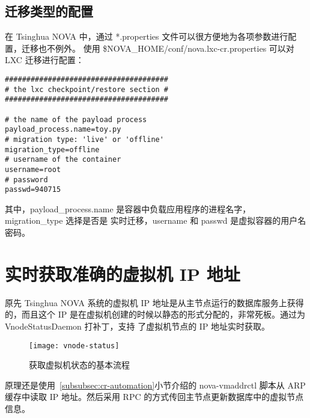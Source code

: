 \subsection{迁移类型的配置}

在 Tsinghua NOVA 中，通过 *.properties 文件可以很方便地为各项参数进行配置，迁移也不例外。
使用 \$NOVA\_HOME/conf/nova.lxc-cr.properties 可以对 LXC 迁移进行配置：

\begin{lstlisting}
######################################
# the lxc checkpoint/restore section #
######################################

# the name of the payload process
payload_process.name=toy.py
# migration type: 'live' or 'offline'
migration_type=offline
# username of the container
username=root
# password
passwd=940715
\end{lstlisting}

其中，payload\_process.name 是容器中负载应用程序的进程名字，migration\_type 选择是否是
实时迁移，username 和 passwd 是虚拟容器的用户名密码。

\section{实时获取准确的虚拟机 IP 地址}

原先 Tsinghua NOVA 系统的虚拟机 IP 地址是从主节点运行的数据库服务上获得的，而且这个 IP
是在虚拟机创建的时候以静态的形式分配的，非常死板。通过为 VnodeStatusDaemon 打补丁，支持
了虚拟机节点的 IP 地址实时获取。

\begin{figure}[h]
    \centering
    \texttt{[image: vnode-status]}
    \caption{获取虚拟机状态的基本流程}
\end{figure}

原理还是使用~\ref{subsubsec:cr-automation}小节介绍的 nova-vmaddrctl 脚本从 ARP 缓存中读取 IP
地址。然后采用 RPC 的方式传回主节点更新数据库中的虚拟节点信息。
